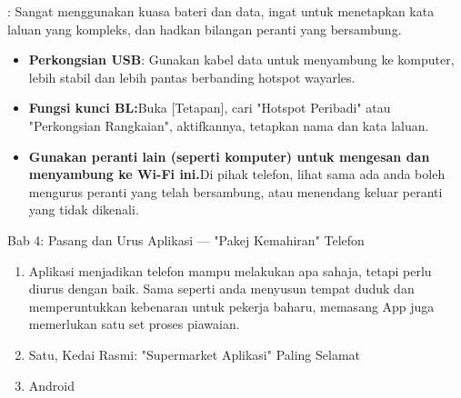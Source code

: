 
: Sangat menggunakan kuasa bateri dan data, ingat untuk menetapkan kata laluan yang kompleks, dan hadkan bilangan peranti yang bersambung.

\begin{itemize}
  \item \textbf{Perkongsian USB}: Gunakan kabel data untuk menyambung ke komputer, lebih stabil dan lebih pantas berbanding hotspot wayarles.
  \item \textbf{Fungsi kunci BL:}Buka [Tetapan], cari "Hotspot Peribadi" atau "Perkongsian Rangkaian", aktifkannya, tetapkan nama dan kata laluan.
  \item \textbf{Gunakan peranti lain (seperti komputer) untuk mengesan dan menyambung ke Wi-Fi ini.}Di pihak telefon, lihat sama ada anda boleh mengurus peranti yang telah bersambung, atau menendang keluar peranti yang tidak dikenali.
\end{itemize}

\begin{tcbpractice}{Bab 4: Pasang dan Urus Aplikasi — "Pakej Kemahiran" Telefon}
\begin{enumerate}
  \item Aplikasi menjadikan telefon mampu melakukan apa sahaja, tetapi perlu diurus dengan baik. Sama seperti anda menyusun tempat duduk dan memperuntukkan kebenaran untuk pekerja baharu, memasang App juga memerlukan satu set proses piawaian.
  \item Satu, Kedai Rasmi: "Supermarket Aplikasi" Paling Selamat
  \item Android
\end{enumerate}

\end{tcbpractice}
